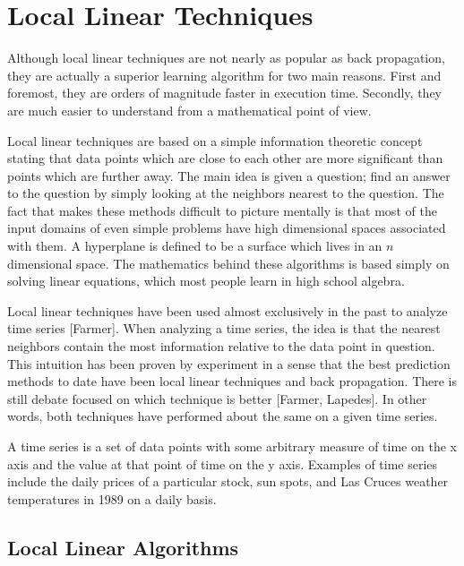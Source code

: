 \parskip 0.20in
\textheight 8.75in
\textwidth 6.0in
\topmargin -0.25in
\oddsidemargin 0.40in


\baselineskip 0.30in

\setcounter{chapter}{2}
\setcounter{page}{13}

\chapter{Local Linear Techniques}	

	Although local linear techniques are not nearly as popular as
back propagation, they are actually a superior learning algorithm for
two main reasons.  First and foremost, they are orders of magnitude
faster in execution time.  Secondly, they are much easier to
understand from a mathematical point of view.

	Local linear techniques are based on a simple information
theoretic concept stating that data points which are close to each
other are more significant than points which are further away.  The
main idea is given a question; find an answer to the question by
simply looking at the neighbors nearest to the question.  The fact
that makes these methods difficult to picture mentally is that most of
the input domains of even simple problems have high dimensional spaces
associated with them.  A hyperplane is defined to be a surface which
lives in an $n$ dimensional space.  The mathematics behind these
algorithms is based simply on solving linear equations, which most
people learn in high school algebra.

	Local linear techniques have been used almost exclusively in
the past to analyze time series [Farmer].  When analyzing a time
series, the idea is that the nearest neighbors contain the most
information relative to the data point in question.  This intuition
has been proven by experiment in a sense that the best prediction
methods to date have been local linear techniques and back
propagation.  There is still debate focused on which technique is
better [Farmer, Lapedes].  In other words, both techniques have
performed about the same on a given time series.

 	A time series is a set of data points with some arbitrary
measure of time on the x axis and the value at that point of time on
the y axis.  Examples of time series include the daily prices of a
particular stock, sun spots, and Las Cruces weather temperatures in
1989 on a daily basis.

\section{Local Linear Algorithms}
	
